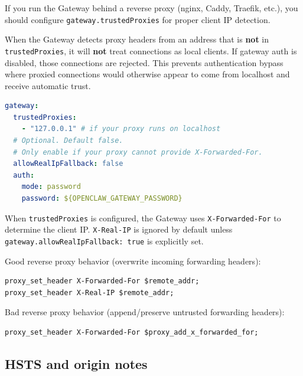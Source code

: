 If you run the Gateway behind a reverse proxy (nginx, Caddy, Traefik, etc.), you should configure \texttt{gateway.trustedProxies} for proper client IP detection.

When the Gateway detects proxy headers from an address that is \textbf{not} in \texttt{trustedProxies}, it will \textbf{not} treat connections as local clients. If gateway auth is disabled, those connections are rejected. This prevents authentication bypass where proxied connections would otherwise appear to come from localhost and receive automatic trust.

\begin{lstlisting}[language=yaml]
gateway:
  trustedProxies:
    - "127.0.0.1" # if your proxy runs on localhost
  # Optional. Default false.
  # Only enable if your proxy cannot provide X-Forwarded-For.
  allowRealIpFallback: false
  auth:
    mode: password
    password: ${OPENCLAW_GATEWAY_PASSWORD}
\end{lstlisting}


When \texttt{trustedProxies} is configured, the Gateway uses \texttt{X-Forwarded-For} to determine the client IP. \texttt{X-Real-IP} is ignored by default unless \texttt{gateway.allowRealIpFallback: true} is explicitly set.

Good reverse proxy behavior (overwrite incoming forwarding headers):

\begin{lstlisting}
proxy_set_header X-Forwarded-For $remote_addr;
proxy_set_header X-Real-IP $remote_addr;
\end{lstlisting}


Bad reverse proxy behavior (append/preserve untrusted forwarding headers):

\begin{lstlisting}
proxy_set_header X-Forwarded-For $proxy_add_x_forwarded_for;
\end{lstlisting}


\subsection{HSTS and origin notes}


